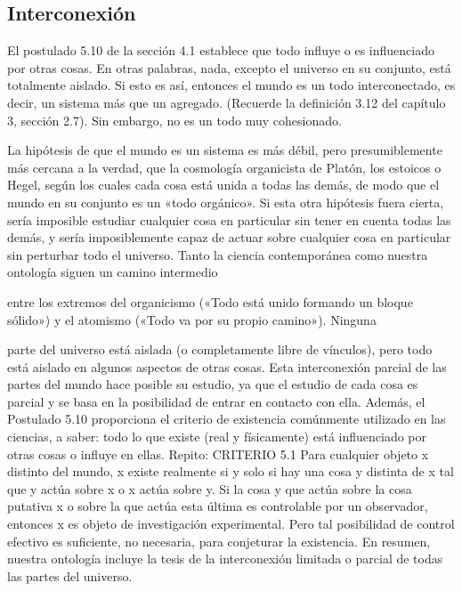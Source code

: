 \begin{justifying}
      \subsection{Interconexión}
      El postulado 5.10 de la sección 4.1 establece que todo influye o es
  influenciado por otras cosas. En otras palabras, nada, excepto
  el universo en su conjunto, está totalmente aislado. Si esto es así, entonces el mundo es
  un todo interconectado, es decir, un sistema más que un agregado. (Recuerde
  la definición 3.12 del capítulo 3, sección 2.7). Sin embargo, no es un todo muy cohesionado.

  La hipótesis de que el mundo es un sistema es más débil, pero presumiblemente
  más cercana a la verdad, que la cosmología organicista de Platón, los estoicos o
  Hegel, según los cuales cada cosa está unida a todas las demás, de modo que
  el mundo en su conjunto es un «todo orgánico». Si esta otra hipótesis
  fuera cierta, sería imposible estudiar cualquier cosa en particular
  sin tener en cuenta todas las demás, y sería imposiblemente
  capaz de actuar sobre cualquier cosa en particular sin perturbar todo el
  universo.
  Tanto la ciencia contemporánea como nuestra ontología siguen un camino intermedio

  entre los extremos del organicismo («Todo está unido formando un bloque sólido»)
  y el atomismo («Todo va por su propio camino»). Ninguna

  parte del universo está aislada (o completamente libre de vínculos), pero todo
  está aislado en algunos aspectos de otras cosas. Esta interconexión parcial
  de las partes del mundo hace posible su estudio,
  ya que el estudio de cada cosa es parcial y se basa en la posibilidad de
  entrar en contacto con ella.
  Además, el Postulado 5.10 proporciona el criterio de existencia comúnmente
  utilizado en las ciencias, a saber: todo lo que existe (real y físicamente) está
  influenciado por otras cosas o influye en ellas. Repito:
      \noindent
  \bigskip
    CRITERIO 5.1 Para cualquier objeto x distinto del mundo, x existe realmente si y solo si
  hay una cosa y distinta de x tal que y actúa sobre x o x actúa sobre y.
  Si la cosa y que actúa sobre la cosa putativa x o sobre la que actúa esta última es
  controlable por un observador, entonces x es objeto de investigación experimental.
  Pero tal posibilidad de control efectivo es suficiente, no
  necesaria, para conjeturar la existencia.
  En resumen, nuestra ontología incluye la tesis de la interconexión limitada o parcial
  de todas las partes del universo.
    \noindent
    \bigskip

\end{justifying}

